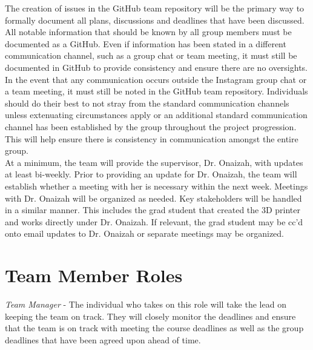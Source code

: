 \documentclass{article}
\begin{document}
The creation of issues in the GitHub team repository will be the primary way to formally document all plans,
discussions and deadlines that have been discussed. All notable information that should be known by all group
members must be documented as a GitHub. Even if information has been stated in a different communication channel,
such as a group chat or team meeting, it must still be documented in GitHub to provide consistency and ensure there
are no oversights.\\

In the event that any communication occurs outside the Instagram group chat or a team meeting, it must still be
noted in the GitHub team repository. Individuals should do their best to not stray from the standard communication
channels unless extenuating circumstances apply or an additional standard communication channel has been established
by the group throughout the project progression. This will help ensure there is consistency in communication amongst
the entire group.\\

At a minimum, the team will provide the supervisor, Dr. Onaizah, with updates at least bi-weekly. Prior to providing
an update for Dr. Onaizah, the team will establish whether a meeting with her is necessary within the next week.
Meetings with Dr. Onaizah will be organized as needed. Key stakeholders will be handled in a similar manner. This
includes the grad student that created the 3D printer and works directly under Dr. Onaizah. If relevant, the grad
student may be cc’d onto email updates to Dr. Onaizah or separate meetings may be organized.

\section{Team Member Roles}

\iffalse
\wss{You should identify the types of roles you anticipate, like notetaker,
leader, meeting chair, reviewer.  Assigning specific people to those roles is
not necessary at this stage.  In a student team the role of the individuals will
likely change throughout the year.}
\fi

\textit{Team Manager} - The individual who takes on this role will take the lead on keeping the team on track. They
will closely monitor the deadlines and ensure that the team is on track with meeting the course deadlines as well as
the group deadlines that have been agreed upon ahead of time.\\
\end{document}
